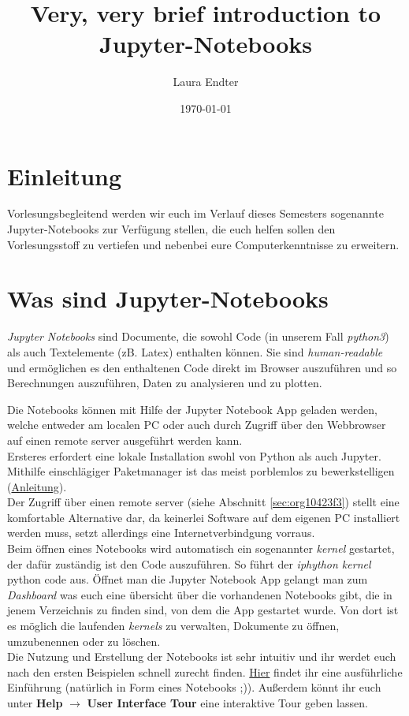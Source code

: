 \documentclass[oneside,bibliography=totoc,listof=totoc,BCOR=5mm,DIV=12,colorlinks=true,linkcolor=blue,citecolor=black, urlcolor=blue]{article}
\author{Laura Endter}
\date{\today}
\title{Very, very brief introduction to Jupyter-Notebooks}
\begin{document}
\maketitle
\tableofcontents



\section{Einleitung}
\label{sec:org1dfb6c6}
Vorlesungsbegleitend werden wir euch im Verlauf dieses Semesters sogenannte Jupyter-Notebooks zur Verfügung stellen, die euch helfen sollen den Vorlesungsstoff zu vertiefen und nebenbei eure Computerkenntnisse zu erweitern.


\section{Was sind Jupyter-Notebooks}
\label{sec:orgd657ea3}
\emph{Jupyter Notebooks} sind Documente, die sowohl Code (in unserem Fall \emph{python3}) als auch Textelemente (zB. Latex) enthalten können. Sie sind \emph{human-readable} und ermöglichen es den enthaltenen Code direkt im Browser auszuführen und so Berechnungen auszuführen, Daten zu analysieren und zu plotten.

\noindent Die Notebooks können mit Hilfe der Jupyter Notebook App geladen werden, welche entweder am localen PC oder auch durch Zugriff über den Webbrowser auf einen remote server ausgeführt werden kann.\\
\noindent Ersteres erfordert eine lokale Installation swohl von Python als auch Jupyter. Mithilfe einschlägiger Paketmanager ist das meist porblemlos zu bewerkstelligen (\href{http://jupyter.org/install.html}{Anleitung}).
\\
\noindent Der Zugriff über einen remote server (siehe Abschnitt \ref{sec:org10423f3}) stellt eine komfortable Alternative dar, da keinerlei Software auf dem eigenen PC installiert werden muss, setzt allerdings eine Internetverbindgung vorraus.
\\
\noindent Beim öffnen eines Notebooks wird automatisch ein sogenannter \emph{kernel} gestartet, der dafür zuständig ist den Code auszuführen. So führt der \emph{iphython kernel} python code aus.
\noindent Öffnet man die  Jupyter Notebook App gelangt man zum \emph{Dashboard} was euch eine übersicht über die vorhandenen Notebooks gibt, die in jenem Verzeichnis zu finden sind, von dem die App gestartet wurde. Von dort ist es möglich die laufenden \emph{kernels} zu verwalten, Dokumente zu öffnen, umzubenennen oder zu löschen.
\\
\noindent Die Nutzung und Erstellung der Notebooks ist sehr intuitiv und ihr werdet euch nach den ersten Beispielen schnell zurecht finden.
\href{https://hub.mybinder.org/user/ipython-ipython-in-depth-heujngzw/notebooks/binder/Index.ipynb}{Hier} findet ihr eine ausführliche Einführung (natürlich in Form eines Notebooks ;)). Außerdem könnt ihr euch unter \textbf{Help} \(\rightarrow\) \textbf{User Interface Tour} eine interaktive Tour geben lassen.
\end{document}
